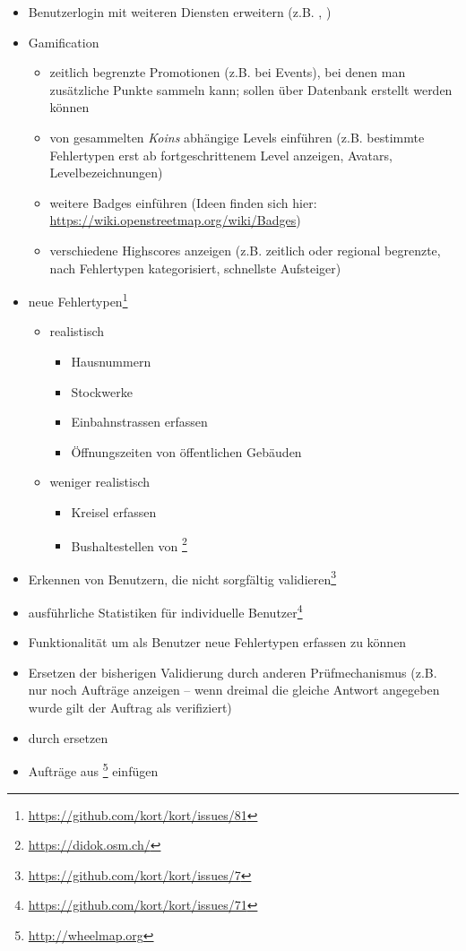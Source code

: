 \begin{itemize}
	\item Benutzerlogin mit weiteren  Diensten erweitern (z.B. , )
	\item \gls{Gamification}
	\begin{itemize}
		\item zeitlich begrenzte Promotionen (z.B. bei Events), bei denen man zusätzliche Punkte sammeln kann; sollen über Datenbank erstellt werden können
		\item von gesammelten \emph{Koins} abhängige Levels einführen (z.B. bestimmte Fehlertypen erst ab fortgeschrittenem Level anzeigen, Avatars, Levelbezeichnungen)
		\item weitere Badges einführen (Ideen finden sich hier: \url{https://wiki.openstreetmap.org/wiki/Badges})
		\item verschiedene Highscores anzeigen (z.B. zeitlich oder regional begrenzte, nach Fehlertypen kategorisiert, schnellste Aufsteiger)
	\end{itemize}
	\item neue Fehlertypen\footnote{\url{https://github.com/kort/kort/issues/81}}
	\begin{itemize}
		\item realistisch
		\begin{itemize}
			\item Hausnummern
			\item Stockwerke
			\item Einbahnstrassen erfassen
			\item Öffnungszeiten von öffentlichen Gebäuden
		\end{itemize}
		\item weniger realistisch
		\begin{itemize}
			\item Kreisel erfassen
			\item Bushaltestellen von \footnote{\url{https://didok.osm.ch/}}
		\end{itemize}
	\end{itemize}
	\item Erkennen von Benutzern, die nicht sorgfältig validieren\footnote{\url{https://github.com/kort/kort/issues/7}}
	\item ausführliche Statistiken für individuelle Benutzer\footnote{\url{https://github.com/kort/kort/issues/71}}
	\item Funktionalität um als Benutzer neue Fehlertypen erfassen zu können
	\item Ersetzen der bisherigen Validierung durch anderen Prüfmechanismus (z.B. nur noch Aufträge anzeigen – wenn dreimal die gleiche Antwort angegeben wurde gilt der Auftrag als verifiziert)
	\item {} durch  ersetzen
	\item Aufträge aus \footnote{\url{http://wheelmap.org}}	 einfügen
\end{itemize}

